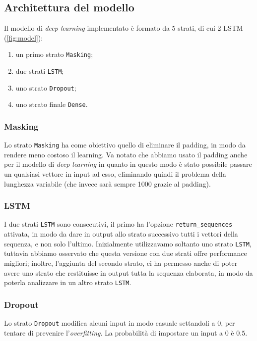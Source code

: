 \documentclass[8pt,notitlepage]{report}
\begin{document}
		\subsection{Architettura del modello}
			Il modello di \textit{deep learning} implementato è formato da 5 strati, di cui 2 LSTM (\cref{fig:model}):
			\begin{enumerate}
				\item un primo strato \verb|Masking|;
				\item due strati \verb|LSTM|;
				\item uno strato \verb|Dropout|;
				\item uno strato finale \verb|Dense|.
			\end{enumerate}
			
				\subsubsection{Masking}
					Lo strato \verb|Masking| ha come obiettivo quello di eliminare il padding, in modo da rendere meno costoso il learning. Va notato che abbiamo usato il padding anche per il modello di \textit{deep learning} in quanto in questo modo è stato possibile passare un qualsiasi vettore in input ad esso, eliminando quindi il problema della lunghezza variabile (che invece sarà sempre 1000 grazie al padding).
					
				\subsubsection{LSTM}
					I due strati \verb|LSTM| sono consecutivi, il primo ha l'opzione \verb|return_sequences| attivata, in modo da dare in output allo strato successivo tutti i vettori della sequenza, e non solo l'ultimo. Inizialmente utilizzavamo soltanto uno strato \verb|LSTM|, tuttavia abbiamo osservato che questa versione con due strati offre performance migliori; inoltre, l'aggiunta del secondo strato, ci ha permesso anche di poter avere uno strato che restituisse in output tutta la sequenza elaborata, in modo da poterla analizzare in un altro strato \verb|LSTM|.
					
				\subsubsection{Dropout}
					Lo strato \verb|Dropout| modifica alcuni input in modo casuale settandoli a $ 0 $, per tentare di prevenire l'\textit{overfitting}. La probabilità di impostare un input a $ 0 $ è $ 0.5 $.
					
\end{document}

